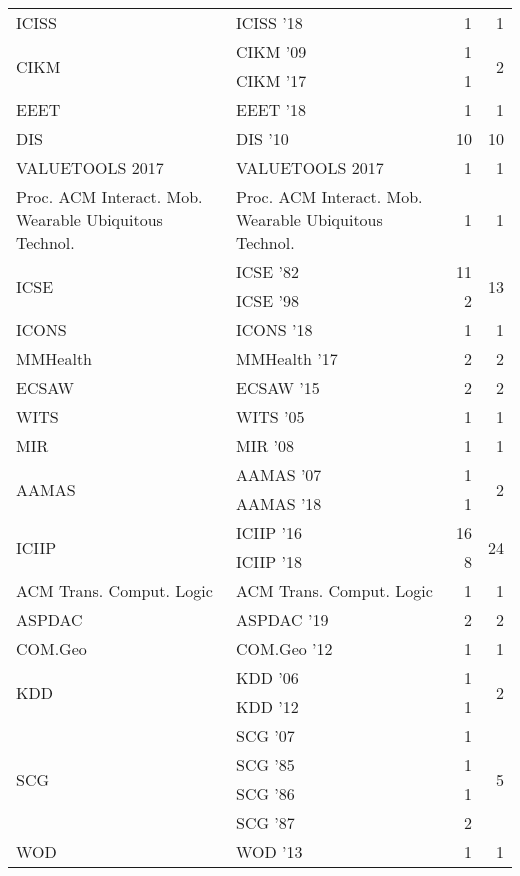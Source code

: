 \begin{table*}[t]
\begin{tabular}{llrr}
\multirow{1}{*}{ICISS } & ICISS '18 & 1 & \multirow{1}{*}{1}\\
\multirow{2}{*}{CIKM } & CIKM '09 & 1 & \multirow{2}{*}{2}\\
& CIKM '17 & 1 &\\
\multirow{1}{*}{EEET } & EEET '18 & 1 & \multirow{1}{*}{1}\\
\multirow{1}{*}{DIS } & DIS '10 & 10 & \multirow{1}{*}{10}\\
\multirow{1}{*}{VALUETOOLS 2017} & VALUETOOLS 2017 & 1 & \multirow{1}{*}{1}\\
\multirow{1}{*}{Proc. ACM Interact. Mob. Wearable Ubiquitous Technol.} & Proc. ACM Interact. Mob. Wearable Ubiquitous Technol. & 1 & \multirow{1}{*}{1}\\
\multirow{2}{*}{ICSE } & ICSE '82 & 11 & \multirow{2}{*}{13}\\
& ICSE '98 & 2 &\\
\multirow{1}{*}{ICONS } & ICONS '18 & 1 & \multirow{1}{*}{1}\\
\multirow{1}{*}{MMHealth } & MMHealth '17 & 2 & \multirow{1}{*}{2}\\
\multirow{1}{*}{ECSAW } & ECSAW '15 & 2 & \multirow{1}{*}{2}\\
\multirow{1}{*}{WITS } & WITS '05 & 1 & \multirow{1}{*}{1}\\
\multirow{1}{*}{MIR } & MIR '08 & 1 & \multirow{1}{*}{1}\\
\multirow{2}{*}{AAMAS } & AAMAS '07 & 1 & \multirow{2}{*}{2}\\
& AAMAS '18 & 1 &\\
\multirow{2}{*}{ICIIP } & ICIIP '16 & 16 & \multirow{2}{*}{24}\\
& ICIIP '18 & 8 &\\
\multirow{1}{*}{ACM Trans. Comput. Logic} & ACM Trans. Comput. Logic & 1 & \multirow{1}{*}{1}\\
\multirow{1}{*}{ASPDAC } & ASPDAC '19 & 2 & \multirow{1}{*}{2}\\
\multirow{1}{*}{COM.Geo } & COM.Geo '12 & 1 & \multirow{1}{*}{1}\\
\multirow{2}{*}{KDD } & KDD '06 & 1 & \multirow{2}{*}{2}\\
& KDD '12 & 1 &\\
\multirow{4}{*}{SCG } & SCG '07 & 1 & \multirow{4}{*}{5}\\
& SCG '85 & 1 &\\
& SCG '86 & 1 &\\
& SCG '87 & 2 &\\
\multirow{1}{*}{WOD } & WOD '13 & 1 & \multirow{1}{*}{1}\\

\end{tabular}
\end{table*}
